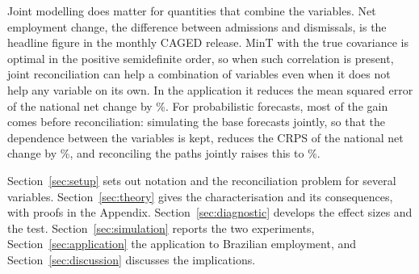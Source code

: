 Joint modelling does matter for quantities that combine the variables. Net employment change, the difference between admissions and dismissals, is the headline figure in the monthly CAGED release. MinT with the true covariance is optimal in the positive semidefinite order, so when such correlation is present, joint reconciliation can help a combination of variables even when it does not help any variable on its own. In the application it reduces the mean squared error of the national net change by \appNetPointTotal\%. For probabilistic forecasts, most of the gain comes before reconciliation: simulating the base forecasts jointly, so that the dependence between the variables is kept, reduces the CRPS of the national net change by \appNetJointSepTotal\%, and reconciling the paths jointly raises this to \appNetJointJointTotal\%.

Section~\ref{sec:setup} sets out notation and the reconciliation problem for several variables. Section~\ref{sec:theory} gives the characterisation and its consequences, with proofs in the Appendix. Section~\ref{sec:diagnostic} develops the effect sizes and the test. Section~\ref{sec:simulation} reports the two experiments, Section~\ref{sec:application} the application to Brazilian employment, and Section~\ref{sec:discussion} discusses the implications.
